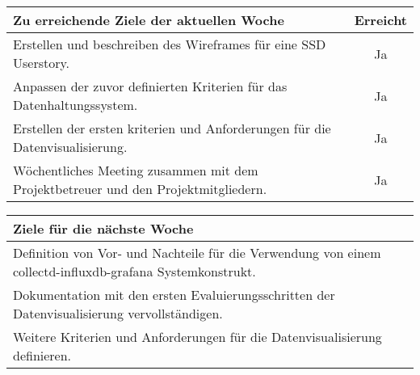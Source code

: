 \begin{tabularx}{\textwidth}{Xc}
    \arrayrulecolor{OliveGreen}
    \toprule
    {\bfseries Zu erreichende Ziele der aktuellen Woche} & {\bfseries Erreicht} \\
    \midrule[2pt]
    Erstellen und beschreiben des Wireframes für eine SSD Userstory. &Ja      \\
    \rowcolor{OliveGreen!15}
    Anpassen der zuvor definierten Kriterien für das Datenhaltungssystem. &Ja \\
    \rowcolor{White}
    Erstellen der ersten kriterien und Anforderungen für die
    Datenvisualisierung.  &Ja                    \\
    \rowcolor{OliveGreen!15}
    Wöchentliches Meeting zusammen mit dem Projektbetreuer und den
    Projektmitgliedern. &Ja                       \\
   \bottomrule[2pt]
\end{tabularx}
%
\vspace{1cm}
%
\begin{tabularx}{\textwidth}{Xc}
    \arrayrulecolor{OliveGreen}
    \toprule
    {\bfseries Ziele für die nächste Woche}              &                      \\
    \midrule[2pt]
    Definition von Vor- und Nachteile für die Verwendung von einem
    collectd-influxdb-grafana Systemkonstrukt.  &                 \\
    \rowcolor{OliveGreen!15}
    Dokumentation mit den ersten Evaluierungsschritten der Datenvisualisierung
    vervollständigen. &                 \\
    \rowcolor{White}
    Weitere Kriterien und Anforderungen für die Datenvisualisierung
    definieren.                  &                 \\
\end{tabularx}
